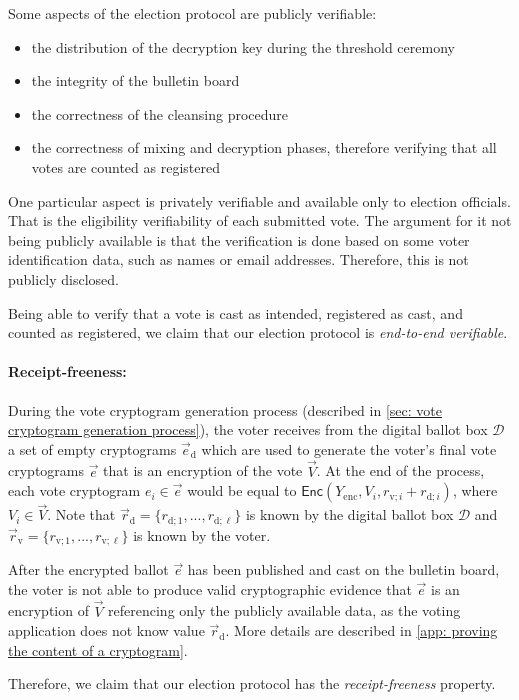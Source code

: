 Some aspects of the election protocol are publicly verifiable:
\begin{itemize}
    \item the distribution of the decryption key during the threshold ceremony
    \item the integrity of the bulletin board
    \item the correctness of the cleansing procedure
    \item the correctness of mixing and decryption phases, therefore verifying that all votes are counted as registered
\end{itemize}

One particular aspect is privately verifiable and available only to election officials. That is the eligibility verifiability of each submitted vote. The argument for it not being publicly available is that the verification is done based on some voter identification data, such as names or email addresses. Therefore, this is not publicly disclosed.

Being able to verify that a vote is cast as intended, registered as cast, and counted as registered, we claim that our election protocol is \textit{end-to-end verifiable}.


\paragraph{Receipt-freeness:}
During the vote cryptogram generation process (described in \cref{sec: vote cryptogram generation process}), the voter receives from the digital ballot box $\mathcal{D}$ a set of empty cryptograms $\vec{e}_\mathrm{d}$ which are used to generate the voter's final vote cryptograms $\vec{e}$ that is an encryption of the vote $\vec{V}$. At the end of the process, each vote cryptogram $e_i \in \vec{e}$ would be equal to $\mathsf{Enc} (Y_\mathrm{enc}, V_i, r_{\mathrm{v}; i} + r_{\mathrm{d}; i})$, where $V_i \in \vec{V}$. Note that $\vec{r}_\mathrm{d} = \{ r_{\mathrm{d}; 1}, ..., r_{\mathrm{d}; \ell} \}$ is known by the digital ballot box $\mathcal{D}$ and $\vec{r}_\mathrm{v} = \{ r_{\mathrm{v}; 1}, ..., r_{\mathrm{v}; \ell} \}$ is known by the voter.

After the encrypted ballot $\vec{e}$ has been published and cast on the bulletin board, the voter is not able to produce valid cryptographic evidence that $\vec{e}$ is an encryption of $\vec{V}$ referencing only the publicly available data, as the voting application does not know value $\vec{r}_\mathrm{d}$. More details are described in \cref{app: proving the content of a cryptogram}.

Therefore, we claim that our election protocol has the \textit{receipt-freeness} property.

